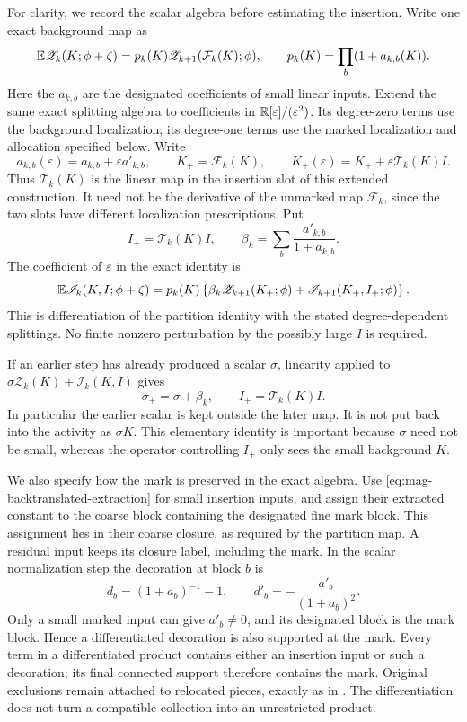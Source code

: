 For clarity, we record the scalar algebra before estimating the
insertion.  Write one exact background map as
\begin{equation}\label{eq:mag-one-map}
 \mathbb E\mathscr Z_k(K;\phi+\zeta)
   =p_k(K)\mathscr Z_{k+1}(\mathcal F_k(K);\phi),
 \qquad
 p_k(K)=\prod_b(1+a_{k,b}(K)).
\end{equation}
Here the $a_{k,b}$ are the designated coefficients of small linear
inputs.  Extend the same exact splitting algebra to coefficients in
$\mathbb R[\varepsilon]/(\varepsilon^2)$.  Its degree-zero terms use the
background localization; its degree-one terms use the marked
localization and allocation specified below.  Write
\[
 a_{k,b}(\varepsilon)=a_{k,b}+\varepsilon a'_{k,b},
 \qquad K_+=\mathcal F_k(K),\qquad
 K_+(\varepsilon)=K_++\varepsilon\mathcal T_k(K)I.
\]
Thus $\mathcal T_k(K)$ is the linear map in the insertion slot of
this extended construction.  It need not be the derivative of the
unmarked map $\mathcal F_k$, since the two slots have different
localization prescriptions.  Put
\[
 I_+=\mathcal T_k(K)I,
 \qquad
 \beta_k=\sum_b\frac{a'_{k,b}}{1+a_{k,b}}.
\]
The coefficient of $\varepsilon$ in the exact identity is
\begin{equation}\label{eq:mag-differentiated-map}
 \mathbb E\mathscr I_k(K,I;\phi+\zeta)
 =p_k(K)\left\{\beta_k\mathscr Z_{k+1}(K_+;\phi)
                    +\mathscr I_{k+1}(K_+,I_+;\phi)\right\}.
\end{equation}
This is differentiation of the partition identity with the stated
degree-dependent splittings.  No finite nonzero perturbation by the
possibly large $I$ is required.

If an earlier step has already produced a scalar $\sigma$, linearity
applied to $\sigma\mathscr Z_k(K)+\mathscr I_k(K,I)$ gives
\begin{equation}\label{eq:mag-scalar-recursion}
 \sigma_+=\sigma+\beta_k,
 \qquad I_+=\mathcal T_k(K)I.
\end{equation}
In particular the earlier scalar is kept outside the later map.
It is not put back into the activity as $\sigma K$.
This elementary identity is important because $\sigma$ need not
be small, whereas the operator controlling $I_+$ only sees the
small background $K$.

We also specify how the mark is preserved in the exact algebra.
Use \eqref{eq:mag-backtranslated-extraction} for small insertion
inputs, and assign their extracted constant to the coarse block
containing the designated fine mark block.  This assignment lies
in their coarse closure, as required by the partition map.  A
residual input keeps its closure label, including the mark.
In the scalar normalization step the decoration at block $b$ is
\[
 d_b=(1+a_b)^{-1}-1,
 \qquad d'_b=-\frac{a'_b}{(1+a_b)^2}.
\]
Only a small marked input can give $a'_b\ne0$, and its designated
block is the mark block.  Hence a differentiated decoration is
also supported at the mark.  Every term in a differentiated
product contains either an insertion input or such a decoration;
its final connected support therefore contains the mark.  Original
exclusions remain attached to relocated pieces, exactly as in
\cite[Proposition 4.8]{B}.  The differentiation
does not turn a compatible collection into an unrestricted product.

